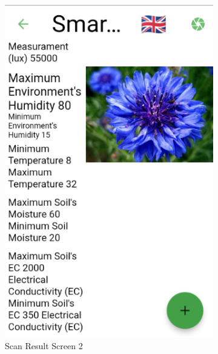 \documentclass[a4paper,12pt]{report}
\begin{document}
\begin{figure}[H]
\begin{subfigure}{0.3\textwidth}
		\includegraphics[width=\textwidth]{./images/scan_result/scan_result_screen2.png}
		\caption{Scan Result Screen 2}
		\label{fig:scan_result2}
	\end{subfigure}
	\hfill
	\begin{subfigure}{0.3\textwidth}

\end{subfigure}
\end{figure}
\end{document}
